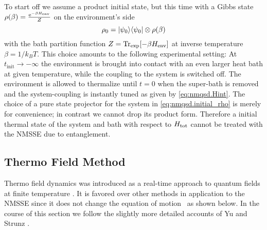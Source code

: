 To start off we assume a product initial state, but this time with a Gibbs state $\rho(\beta) = \frac{\exp[-\beta \Henv]}{Z}$ on the environment's side
\begin{equation}
  \rho_0 = | \psi_0 \rangle\langle \psi_0 | \otimes \rho(\beta)
  \label{eq:nmqsd.initial_rho}
\end{equation}
with the bath partition function $Z = \Tr \exp[-\beta \Henv]$ at inverse temperature $\beta = 1/k_B T$.
This choice amounts to the following experimental setting:
At $t_\mathrm{init} \to -\infty$ the environment is brought into contact with an even larger heat bath at given temperature, while the coupling to the system is switched off.
The environment is allowed to thermalize until $t=0$ when the super-bath is removed and the system-coupling is instantly tuned as given by \autoref{eq:nmqsd.Hint}.
The choice of a pure state projector for the system in \autoref{eq:nmqsd.initial_rho} is merely for convenience;
in contrast we cannot drop its product form.
Therefore a initial thermal state of the system and bath with respect to $H_\mathrm{tot}$ cannot be treated with the NMSSE due to entanglement.


\subsection{Thermo Field Method}
\label{sub:nmqsd.temperature.thermofield}
%

Thermo field dynamics was introduced as a real-time approach to quantum fields at finite temperature \cite{???}.
It is favored over other methods in application to the NMSSE since it does not change the equation of motion~\cite{DiGiSt98_nmqsd} as shown below.
In the course of this section we follow the slightly more detailed accounts of Yu and Strunz \cite{Yu04_heat_bath,St01_habil}.

